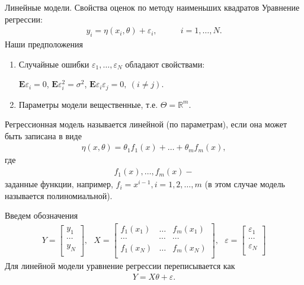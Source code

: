 \documentclass[10pt,slidestop,usepdftitle=false]{beamer}
\begin{document}
\begin{frame}{Линейные модели. Свойства оценок по методу наименьших квадратов }
Уравнение регрессии:
 \begin{align*}
	y_{i} = \eta(x_i,\theta) + \varepsilon_{i}, \qquad &i = 1, \dots, N.
 \end{align*}
 Наши предположения
 \begin{enumerate}
 \item Случайные ошибки $\varepsilon_1,\dots,\varepsilon_N$ обладают свойствами:   
 
 $\mathbf{E}\varepsilon_i = 0$,
 $\mathbf{E}\varepsilon_i^2 = \sigma^2$, 
 $\mathbf{E}\varepsilon_i\varepsilon_j = 0,\ (i\ne j)$.
 
 \item  Параметры модели вещественные, т.е. $\Theta = \mathbb{R}^m$.
 \end{enumerate}
\pause 

Регрессионная модель называется линейной (по параметрам), если она может быть записана в виде
 \begin{align*}
\eta(x,\theta) = \theta_1 f_1(x) + \dots + \theta_m f_m(x),
\end{align*}где
 \begin{align*}
 f_1(x), \dots , f_m(x)-
\end{align*}
заданные функции, например, $f_i= x^{i-1},i=1,2,\dots,m$
(в этом случае модель называется полиномиальной).

\end{frame}
 \begin{frame}
Введем обозначения
\begin{align*}
Y =\left[\begin{array}{c}
                     y_1  \\
                     \cdots \\
                     y_N \\
                   \end{array}\right],\ \ \
                   X= \left[\begin{array}{ccc}
                     f_1(x_1) & \ldots & f_m(x_1) \\
                     \cdots & \cdots & \cdots \\
                     f_1(x_N) & \ldots & f_m(x_N) \\
                   \end{array}\right],  \ \ \ 
                   \varepsilon = \left[\begin{array}{c}
                     \varepsilon_1  \\
                     \cdots \\
                     \varepsilon_N \\
                   \end{array}\right]
\end{align*}
Для линейной модели уравнение регрессии переписывается как
\begin{align*}
Y = X \theta + \varepsilon.
\end{align*}
\end{frame}
\end{document}
